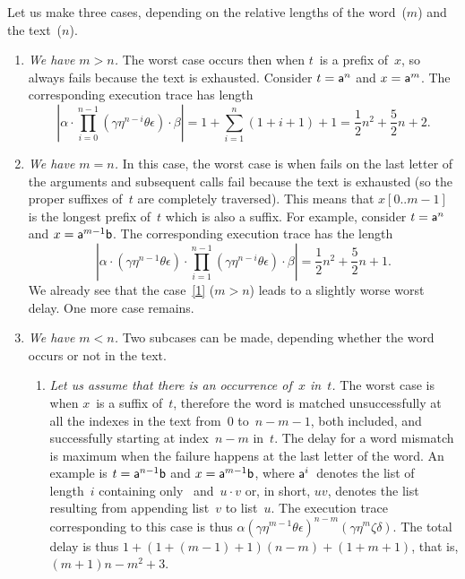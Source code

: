 Let us make three cases, depending on the relative lengths of the
word~(\(m\)) and the text~(\(n\)).
\begin{enumerate}

  \item \label{1} \emph{We have \({m > n}\).} The worst case occurs
    then when \(t\)~is a prefix of~\(x\), so  always
    fails because the text is exhausted. Consider \(t=\textsf{a}^{n}\)
    and \(x=\textsf{a}^m\). The corresponding execution trace has length
    \[
    \left\lvert\alpha \cdot
    \prod_{i=0}^{n-1}{(\gamma\eta^{n-i}\theta\epsilon)}
    \cdot \beta\right\rvert
    =
    1 + \sum_{i=1}^{n}{(1+i+1)} + 1 = \frac{1}{2}{n^2} +
    \frac{5}{2}{n} + 2.
    \]

  \item \emph{We have \({m=n}\).} In this case, the worst case is when
     fails on the last letter of the arguments and
    subsequent calls fail because the text is exhausted (so the proper
    suffixes of~\(t\) are completely traversed). This means that
    \(x[0..m-1]\) is the longest prefix of~\(t\) which is also a
    suffix. For example, consider \(t=\textsf{a}^{n}\) and
    \(x=\textsf{a}^{m-1}\textsf{b}\). The corresponding execution trace
    has the length
    \[
    \left\lvert\alpha \cdot (\gamma\eta^{n-1}\theta\epsilon) \cdot
    \prod_{i=1}^{n-1}{(\gamma\eta^{n-i}\theta\epsilon)} \cdot
    \beta\right\rvert
    = \frac{1}{2}{n^2} + \frac{5}{2}{n} + 1.
    \]
    We already see that the case~\ref{1} (\({m > n}\)) leads to a
    slightly worse worst delay. One more case remains.

  \item \emph{We have \({m < n}\).} Two subcases can be made,
    depending whether the word occurs or not in the text.
    \begin{enumerate}

    \item \label{2a} \emph{Let us assume that there is an occurrence
      of~\(x\) in~\(t\).} The worst case is when \(x\)~is a suffix
      of~\(t\), therefore the word is matched unsuccessfully at all
      the indexes in the text from~\(0\) to~\(n-m-1\), both included,
      and successfully starting at index~\(n-m\) in~\(t\). The delay
      for a word mismatch is maximum when the failure happens at the
      last letter of the word. An example is \(t =
      \textsf{a}^{n-1}\textsf{b}\) and \(x = \textsf{a}^{m-1}\textsf{b}\),
      where \(\textsf{a}^i\)~denotes the list of length~\(i\) containing
      only~ and~\({u \cdot v}\) or, in short, \(uv\),
      denotes the list resulting from appending list~\(v\) to
      list~\(u\). The execution trace corresponding to this case is
      thus \(\alpha(\gamma\eta^{m-1}\theta\epsilon)^{n-m}
      (\gamma\eta^m\zeta\delta)\). The total delay is thus
      \(1+(1+(m-1)+1)(n-m)+(1+m+1)\), that is, \((m+1)n-m^2+3\).


\end{enumerate}
\end{enumerate}
